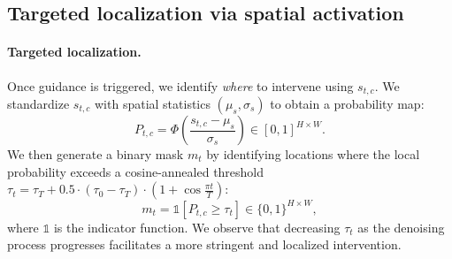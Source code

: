 
\subsection{Targeted localization via spatial activation}
\label{subsec:targeted}

\paragraph{Targeted localization.}
Once guidance is triggered, we identify \emph{where} to intervene using $s_{t,c}$.
We standardize $s_{t,c}$ with spatial statistics $(\mu_s,\sigma_s)$ to obtain a probability map:
\begin{equation}
\label{eq:gradcam_pm}
P_{t,c} = \Phi\!\left(
    \frac{s_{t,c}-\mu_s}{\sigma_s}
\right)\in [0,1]^{H\times W}.
\end{equation}
We then generate a binary mask $m_t$ by identifying locations where the local probability exceeds a cosine-annealed threshold $\tau_{t} = \tau_{T} + 0.5 \cdot (\tau_{0} - \tau_{T}) \cdot (1+ \cos{\frac{\pi t}{T}})$:
\begin{equation}
\label{eq:compute_mask}
m_t = \mathds{1}\!\left[
    P_{t,c}\ge\tau_t
\right] \in \{0,1\}^{H \times W},
\end{equation}
where $\mathds{1}$ is the indicator function.
We observe that decreasing $\tau_t$ as the denoising process progresses facilitates a more stringent and localized intervention.

